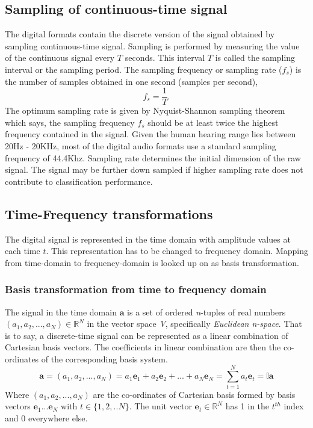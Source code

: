 \subsection{Sampling of continuous-time signal}
\label{sampling}
The digital formats contain the discrete version of the signal obtained by sampling continuous-time signal. Sampling is performed by measuring the value of the continuous signal every $T$ seconds. This interval $T$ is called the sampling interval or the sampling period. The sampling frequency or sampling rate ($f_{s}$) is the number of samples obtained in one second (samples per second),  
\[
 f_{s} = \frac{1}{T}.
\]
The optimum sampling rate is given by Nyquist-Shannon sampling theorem which says, the sampling frequency $f_{s}$ should be at least twice the highest frequency contained in the signal. Given the human hearing range lies between 20Hz - 20KHz, most of the digital audio formats use a standard sampling frequency of 44.4Khz. Sampling rate determines the initial dimension of the raw signal. The signal may be further down sampled if higher sampling rate does not contribute to classification performance.

\subsection{Time-Frequency transformations}
\label{time}
The digital signal is represented in the time domain with amplitude values at each time $t$. This representation has to be changed to frequency domain. Mapping from time-domain to frequency-domain is looked up on as basis transformation. 

\subsubsection{Basis transformation from time to frequency domain}
\noindent The signal in the time domain $\textbf{a}$ is a set of ordered \textit{n}-tuples of real numbers \( (a_{1},a_{2}, ...,a_{N}) \in \mathbb{R}^N \) in the vector space \textit{V}, specifically \textit{Euclidean n-space}. That is to say, a discrete-time signal can be represented as a linear combination of Cartesian basis vectors. The coefficients in linear combination are then the co-ordinates of the corresponding basis system.  
\[
\textbf{a} = (a_{1},a_{2}, ...,a_{N}) = a_{1}\textbf{e}_{1} + a_{2}\textbf{e}_{2} + ... + a_{N}\textbf{e}_{N} = \displaystyle\sum_{t=1}^{N}a_{t}\textbf{e}_{t} = \mathbb{I}\textbf{a}
\]
Where $(a_{1},a_{2}, ...,a_{N})$ are the co-ordinates of Cartesian basis formed by basis vectors $\textbf{e}_{1} ... \textbf{e}_{N}$ with $t \in \{1,2,..N\}$. The unit vector $\textbf{e}_{t} \in \mathbb{R}^{N}$ has 1 in the $t^{th}$ index and 0 everywhere else.
\bigskip

